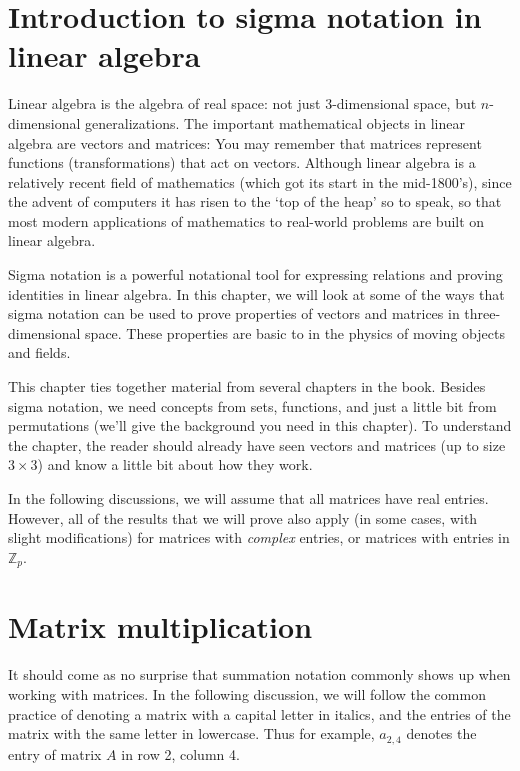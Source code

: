 \section{Introduction to sigma notation in linear algebra\quad
{}}
\label{sec:SigmaApp:LinearAlgebra}

Linear algebra is the algebra of real space: not just 3-dimensional space, but $n$-dimensional generalizations. The important mathematical objects in linear algebra are vectors and matrices: You may remember that matrices represent functions (transformations) that act  on vectors.  Although linear algebra is a relatively recent field of mathematics (which got its start in the mid-1800's), since the advent of computers it has risen to the `top of the heap' so to speak, so that  most modern applications of mathematics to real-world problems are built on linear algebra.

Sigma notation is a powerful notational tool for expressing relations and proving identities in linear algebra. In this chapter, we will look at some of the ways that sigma notation can be used to prove properties of vectors and matrices in three-dimensional space. These properties are basic to in the physics of moving objects and fields.  

This chapter ties together material from several chapters in the book. Besides sigma notation, we need concepts from sets, functions, and just a little bit from permutations (we'll give the background you need in this chapter). To understand the chapter, the reader should already have seen vectors and matrices (up to size $3\times 3$) and know a little bit about how they work.

In the following discussions, we will assume that all matrices have real entries.  However, all of the results that we will prove also apply (in some cases, with slight modifications)  for matrices with \emph{complex} entries, or matrices with entries in $\mathbb{Z}_p$.

\section{Matrix multiplication}
\label{sec:SigmaApp:MatrixMultiplication}


It should come as no surprise that summation notation commonly shows up when working with matrices. 
In the following discussion, we will follow the common practice of denoting a matrix with a capital 
letter in italics, and the entries of the matrix with the same letter in lowercase. 
Thus for example, $a_{2,4}$ denotes the entry of matrix $A$ in row 2, column 4.
   

